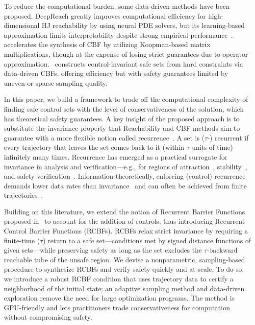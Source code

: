 \documentclass[letterpaper, 10 pt, conference]{ieeeconf}
\begin{document}
To reduce the computational burden, some data-driven methods have been proposed. DeepReach greatly improves computational efficiency for high-dimensional HJ reachability by using neural PDE solvers, but its learning-based approximation limits interpretability despite strong empirical performance~\cite{bansal2021deepreach}.~\cite{folkestad2020data} accelerates the synthesis of CBF by utilizing Koopman-based matrix multiplications, though at the expense of losing strict guarantees due to operator approximation.~\cite{lee2024data} constructs control-invariant safe sets from hard constraints via data-driven CBFs, offering efficiency but with safety guarantees limited by uneven or sparse sampling quality. 

In this paper, we build a framework to trade off the computational complexity of finding safe control sets with the level of conservativeness of the solution, which has theoretical safety guarantees. A key insight of the proposed approach is to substitute the invariance property that Reachability and CBF methods aim to guarantee with a more flexible notion called recurrence~\cite{sspm2023cdc,ssm2024allerton}. A set is ($\tau$-) recurrent if every trajectory that leaves the set comes back to it (within $\tau$ units of time) infinitely many times. Recurrence has emerged as a practical surrogate for invariance in analysis and verification—e.g., for regions of attraction~\cite{sbm2022cdc}, stability~\cite{sspm2023cdc}, and safety verification~\cite{ssm2024allerton}. Information-theoretically, enforcing (control) recurrence demands lower data rates than invariance~\cite{sm2024hscc} and can often be achieved from finite trajectories~\cite{sm2025nahs}.

Building on this literature, we extend the notion of Recurrent Barrier Functions proposed in~\cite{ssm2024allerton} to account for the addition of controls, thus introducing Recurrent Control Barrier Functions (RCBFs). RCBFs relax strict invariance by requiring a finite-time ($\tau$) return to a safe set—conditions met by signed distance functions of given sets—while preserving safety as long as the set excludes the $\tau$-backward reachable tube of the unsafe region.
We devise a nonparametric, sampling-based procedure to synthesize RCBFs and verify safety quickly and at scale. To do so, we introduce a robust RCBF condition that uses trajectory data to certify a neighborhood of the initial state; an adaptive sampling method and data-driven exploration remove the need for large optimization programs. The method is GPU-friendly and lets practitioners trade conservativeness for computation without compromising safety.
\end{document}
